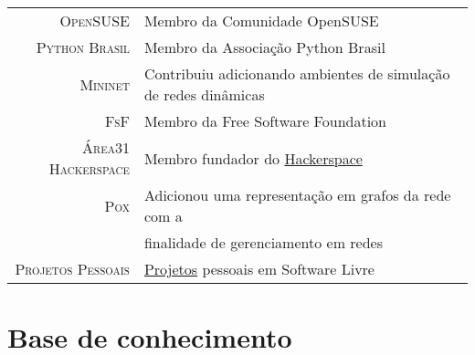 \documentclass[a4paper,10pt]{article} %
\begin{document}
\begin{tabular}{rl}
\textsc{OpenSUSE}  & Membro da Comunidade OpenSUSE \\
\textsc{Python Brasil}  & Membro da Associação Python Brasil \\
\textsc{Mininet}  & Contribuiu adicionando ambientes de simulação de redes
dinâmicas \\
\textsc{FsF} & Membro da Free Software Foundation \\
\textsc{Área31 Hackerspace} & Membro fundador do
\href{http://area31.net.br}{Hackerspace} \\
\textsc{Pox} & Adicionou uma representação em grafos da rede com a
\\ & finalidade de gerenciamento em redes \\
\textsc{Projetos Pessoais} & \href{http://github.com/pantuza}{Projetos}
pessoais em Software Livre \\
\end{tabular}













\section{Base de conhecimento}
\end{document}
